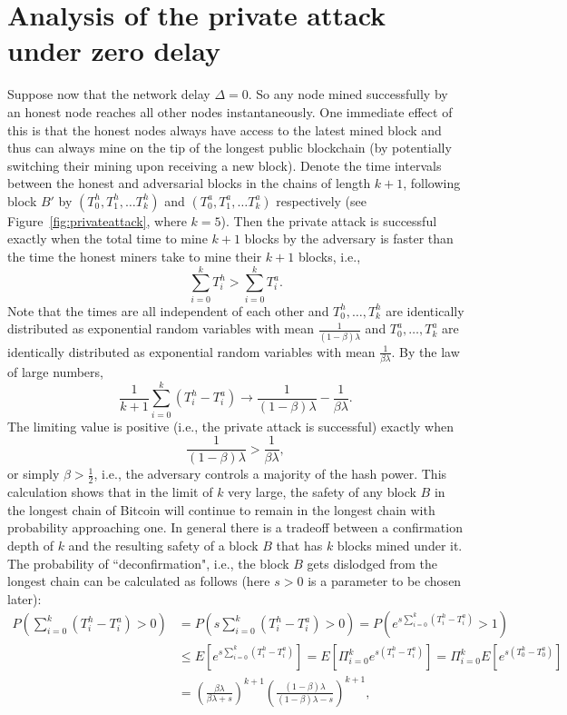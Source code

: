 \documentclass{article}
\begin{document}
\section*{Analysis of the private attack under zero delay}
Suppose now that the network delay $\Delta = 0$. So any node mined successfully by an honest node reaches all other nodes instantaneously. One immediate effect of this is that the honest nodes always have access to the latest mined block and thus can always mine on the tip of the longest public blockchain (by potentially  switching their mining upon receiving a new block).  
Denote the time intervals between the honest and adversarial blocks in the chains of length $k+1$, following block $B'$ by $(T_0^h, T_1^h, \ldots T_k^h)$ and $(T_0^a, T_1^a, \ldots T_k^a)$ respectively (see Figure~\ref{fig:privateattack}, where $k=5$). Then the private attack is successful exactly when the total time to mine $k+1$ blocks by the adversary is faster than the time the honest miners take to mine their $k+1$ blocks, i.e., 
$$
\sum_{i=0}^k T_i^h > \sum_{i=0}^k T_i^a.
$$
Note that the times are all independent of each other and $T_0^h, \ldots ,T^h_k$ are identically distributed as exponential random variables with mean  $\frac{1}{(1-\beta)\lambda}$ and $T_0^a, \ldots ,T^a_k$ are identically distributed as exponential random variables with mean  $\frac{1}{\beta\lambda}$. By the law of large numbers, 
$$
\frac{1}{k+1} \sum_{i=0}^k (T_i^h - T_i^a) \rightarrow  \frac{1}{(1-\beta)\lambda} - \frac{1}{\beta\lambda}. 
$$
The limiting value is positive (i.e., the private attack is successful) exactly when 
$$
\frac{1}{(1-\beta)\lambda} >  \frac{1}{\beta\lambda}, 
$$
or simply $\beta > \frac{1}{2}$, i.e., the adversary controls a majority of the hash power. This calculation shows that in the limit of $k$ very large, the safety of any block $B$ in the longest chain of Bitcoin will continue to remain in the longest chain with probability approaching one. In general there is a tradeoff between a confirmation depth of $k$ and the resulting safety of a block $B$ that has $k$ blocks mined under it. The probability of ``deconfirmation", i.e., the block $B$ gets dislodged from the longest chain can be calculated as follows (here $s > 0$ is a parameter to be chosen later): 
\begin{align}
P(\sum_{i=0}^k (T_i^h - T_i^a) > 0) &= P(s \sum_{i=0}^k (T_i^h - T_i^a) > 0) = 
 P(e^{s \sum_{i=0}^k (T_i^h - T_i^a)} > 1) \\
&\leq E[e^{s \sum_{i=0}^k (T_i^h - T_i^a)}] = E[\Pi_{i=0}^k e^{s(T_i^h - T_i^a)}] = \Pi_{i=0}^k E[e^{s(T_0^h - T_0^a)}] \\
&= \left (\frac{\beta\lambda}{\beta\lambda + s}\right )^{k+1} \left (\frac{(1-\beta)\lambda}{(1-\beta)\lambda - s}\right )^{k+1},
\end{align}
\end{document}
